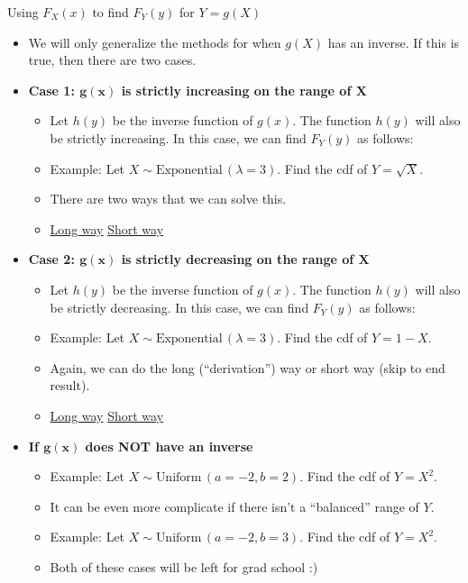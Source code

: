 \documentclass{article}
\newcommand{\follow}[1]{\sim \text{#1}\,}		%
\begin{document}
Using $F_X(x)$ to find $F_Y(y)$ for $Y = g(X)$\bigskip
\begin{itemize}
    \item We will only generalize the methods for when $g(X)$ has an inverse. If this is true, then there are two cases.
    \item \textbf{Case 1: $\boldsymbol{g(x)}$ is strictly increasing on the range of $\boldsymbol{X}$}
    \begin{itemize}
        \item Let $h(y)$ be the inverse function of $g(x)$. The function $h(y)$ will also be strictly increasing. In this case, we can find $F_Y(y)$ as follows:\vspace{150pt}
        \item Example: Let $X \follow{Exponential}(\lambda = 3)$. Find the cdf of $Y = \sqrt{X}$.
        \item[] There are two ways that we can solve this.
        \item[] \ul{Long way} \hspace{200pt} \ul{Short way}\vspace{150pt}
    \end{itemize}
    \item \textbf{Case 2: $\boldsymbol{g(x)}$ is strictly decreasing on the range of $\boldsymbol{X}$}
    \begin{itemize}
        \item Let $h(y)$ be the inverse function of $g(x)$. The function $h(y)$ will also be strictly decreasing. In this case, we can find $F_Y(y)$ as follows:\vspace{200pt}
        \item Example: Let $X \follow{Exponential}(\lambda = 3)$. Find the cdf of $Y = 1 - X$.
        \item[] Again, we can do the long  (``derivation'') way or short way (skip to end result).
        \item[] \ul{Long way} \hspace{200pt} \ul{Short way}\vspace{150pt}
\vspace{300pt}
    \end{itemize}
    \item \textbf{If $\boldsymbol{g(x)}$ does NOT have an inverse}
    \begin{itemize}
        \item Example: Let $X \follow{Uniform}(a = -2, b = 2)$. Find the cdf of $Y = X^2$.\vspace{250pt}
        \item It can be even more complicate if there isn't a ``balanced'' range of $Y$.
        \item[] Example: Let $X \follow{Uniform}(a = -2, b = 3)$. Find the cdf of $Y = X^2$.\vspace{200pt}
        \item Both of these cases will be left for grad school :)
    \end{itemize}
\end{itemize}\bigskip
\end{document}
